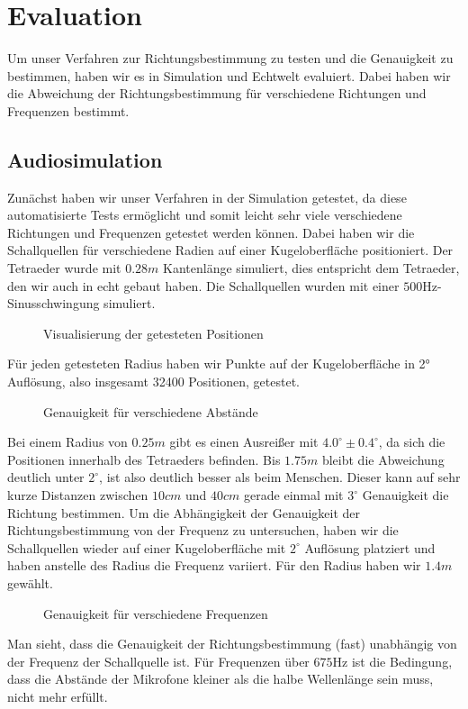 \section{Evaluation}
Um unser Verfahren zur Richtungsbestimmung zu testen und die Genauigkeit zu bestimmen, haben wir es in Simulation und Echtwelt evaluiert. Dabei haben wir die Abweichung der Richtungsbestimmung für verschiedene Richtungen und Frequenzen bestimmt.
\subsection{Audiosimulation}
Zunächst haben wir unser Verfahren in der Simulation getestet, da diese automatisierte Tests ermöglicht und somit leicht sehr viele verschiedene Richtungen und Frequenzen getestet werden können. Dabei haben wir die Schallquellen für verschiedene Radien auf einer Kugeloberfläche positioniert. Der Tetraeder wurde mit $0.28m$ Kantenlänge simuliert, dies entspricht dem Tetraeder, den wir auch in echt gebaut haben. Die Schallquellen wurden mit einer $500\mathrm{Hz}$-Sinusschwingung simuliert.
\begin{figure}[H]
  \centering
  
  \caption{Visualisierung der getesteten Positionen}
  \label{fig:pos}
\end{figure}
Für jeden getesteten Radius haben wir Punkte auf der Kugeloberfläche in 2° Auflösung, also insgesamt 32400 Positionen, getestet.
\begin{figure}[H]
  \centering
  
  \caption{Genauigkeit für verschiedene Abstände}
  \label{fig:pos_sweep}
\end{figure}
Bei einem Radius von $0.25m$ gibt es einen Ausreißer mit $4.0^\circ \pm 0.4^\circ$, da sich die Positionen innerhalb des Tetraeders befinden. Bis $1.75m$ bleibt die Abweichung deutlich unter $2^\circ$, ist also deutlich besser als beim Menschen. Dieser kann auf sehr kurze Distanzen zwischen $10cm$ und $40cm$ gerade einmal mit $3^\circ$ Genauigkeit die Richtung bestimmen. \cite{middlebrooks1991sound}
Um die Abhängigkeit der Genauigkeit der Richtungsbestimmung von der Frequenz zu untersuchen, haben wir die Schallquellen wieder auf einer Kugeloberfläche mit $2^\circ$ Auflösung platziert und haben anstelle des Radius die Frequenz variiert. Für den Radius haben wir $1.4m$ gewählt.
\begin{figure}[H]
  \centering
  
  \caption{Genauigkeit für verschiedene Frequenzen}
  \label{fig:freq_seep}
\end{figure}
Man sieht, dass die Genauigkeit der Richtungsbestimmung (fast) unabhängig von der Frequenz der Schallquelle ist. Für Frequenzen über $675\mathrm{Hz}$ ist die Bedingung, dass die Abstände der Mikrofone kleiner als die halbe Wellenlänge sein muss, nicht mehr erfüllt.
